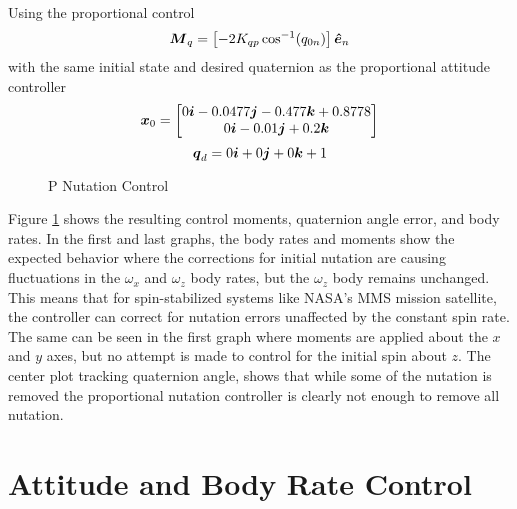 Using the proportional control
\begin{equation}
  \boldsymbol{M}_{q} = \left[-2 K_{qp} \cos^{-1} (q_{0n}) \right] \boldsymbol{\hat{e}}_n
  \label{eqn:PNutationControl}
\end{equation}
with the same initial state and desired quaternion as the proportional attitude controller
\begin{equation}
  \boldsymbol{x}_0 = \begin{bmatrix} 0 \boldsymbol{i} -0.0477 \boldsymbol{j} -0.477 \boldsymbol{k} +0.8778 \\ 0 \boldsymbol{i} -0.01 \boldsymbol{j} +0.2 \boldsymbol{k} \end{bmatrix}
\end{equation}
\begin{equation}
  \boldsymbol{q}_d = 0 \boldsymbol{i} +0 \boldsymbol{j} +0 \boldsymbol{k} + 1
\end{equation}
\begin{figure}[H]
  \centerline{}
  \caption{P Nutation Control}
  \label{fig:PNutationControl}
\end{figure}
Figure \ref{fig:PNutationControl} shows the resulting control moments, quaternion angle error, and body rates.  In the first and last graphs, the body rates and moments show the expected behavior where the corrections for initial nutation are causing fluctuations in the $\omega_x$ and $\omega_z$ body rates, but the $\omega_z$ body remains unchanged.  This means that for spin-stabilized systems like NASA's MMS mission satellite, the controller can correct for nutation errors unaffected by the constant spin rate.  The same can be seen in the first graph where moments are applied about the $x$ and $y$ axes, but no attempt is made to control for the initial spin about $z$.
The center plot tracking quaternion angle, shows that while some of the nutation is removed the proportional nutation controller is clearly not enough to remove all nutation.


\section{Attitude and Body Rate Control}
\label{sec:AttitudeandBodyRateControl}

